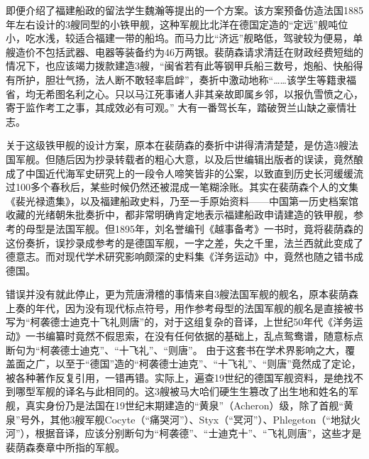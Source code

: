\documentclass[12pt,UTF8]{ctexbook}
\begin{document}
即便介绍了福建船政的留法学生魏瀚等提出的一个方案。该方案预备仿造法国1885年左右设计的3艘同型的小铁甲舰，这种军舰比北洋在德国定造的“定远”舰吨位小，吃水浅，较适合福建一带的船坞。而马力比“济远”舰略低，驾驶较为便易，单艘造价不包括武器、电器等装备约为46万两银。裴荫森请求清廷在财政经费短绌的情况下，也应该竭力拨款建造3艘，“闽省若有此等钢甲兵船三数号，炮船、快船得有所护，胆壮气扬，法人断不敢轻率启衅”，奏折中激动地称“……该学生等籍隶福省，均无希图名利之心。只以马江死事诸人非其亲故即属乡邻，以报仇雪愤之心，寄于监作考工之事，其成效必有可观。” 大有一番驾长车，踏破贺兰山缺之豪情壮志。

关于这级铁甲舰的设计方案，原本在裴荫森的奏折中讲得清清楚楚，是仿造3艘法国军舰。但随后因为抄录转载者的粗心大意，以及后世编辑出版者的误读，竟然酿成了中国近代海军史研究上的一段令人啼笑皆非的公案，以致直到历史长河缓缓流过100多个春秋后，某些时候仍然还被混成一笔糊涂账。其实在裴荫森个人的文集《裴光禄遗集》，以及福建船政史料，乃至一手原始资料——中国第一历史档案馆收藏的光绪朝朱批奏折中，都非常明确肯定地表示福建船政申请建造的铁甲舰，参考的母型是法国军舰。但1895年，刘名誉编刊《越事备考》一书时，竟将裴荫森的这份奏折，误抄录成参考的是德国军舰，一字之差，失之千里，法兰西就此变成了德意志。而对现代学术研究影响颇深的史料集《洋务运动》中，竟然也随之错书成德国。

错误并没有就此停止，更为荒唐滑稽的事情来自3艘法国军舰的舰名，原本裴荫森上奏的年代，因为没有现代标点符号，用作参考母型的法国军舰的舰名是直接被书写为“柯袭德士迪克十飞礼则唐”的，对于这组复杂的音译，上世纪50年代《洋务运动》一书编纂时竟然不假思索，在没有任何依据的基础上，乱点鸳鸯谱，随意标点断句为“柯袭德士迪克”、“十飞礼”、“则唐”。 由于这套书在学术界影响之大，覆盖面之广，以至于“德国”造的“柯袭德士迪克”、“十飞礼”、“则唐”竟然成了定论，被各种著作反复引用，一错再错。实际上，遍查19世纪的德国军舰资料，是绝找不到哪型军舰的译名与此相同的。这3艘被马大哈们硬生生篡改了出生地和姓名的军舰，真实身份乃是法国在19世纪末期建造的“黄泉”（Acheron）级，除了首舰“黄泉”号外，其他3艘军舰Cocyte（“痛哭河”）、Styx（“冥河”）、Phlegeton（“地狱火河”），根据音译，应该分别断句为“柯袭德”、“士迪克十”、“飞礼则唐”，这些才是裴荫森奏章中所指的军舰。
\end{document}

